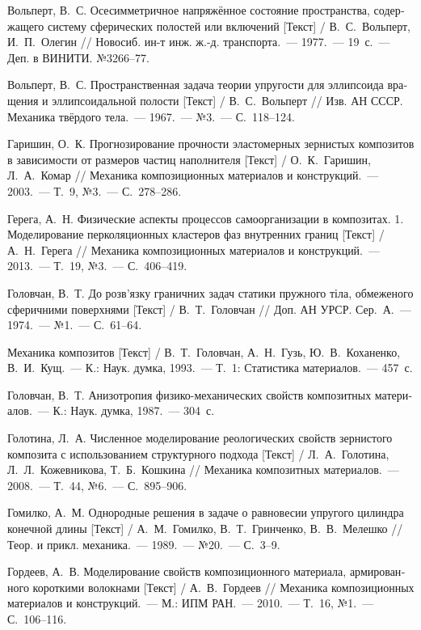 \begin{russian}
\begin{biblist}{99}
Вольперт, В.~С. Осесимметричное напряжённое состояние пространства, содержащего систему сферических полостей или включений [Текст] 
/ В.~С.~Вольперт, И.~П.~Олегин 
// Новосиб. ин-т инж. ж.-д. транспорта.~--- 1977.~--- 19~с.~--- Деп. в ВИНИТИ. №3266--77.

Вольперт, В.~С. 
Пространственная задача теории упругости для эллипсоида вращения и эллипсоидальной полости [Текст] 
/ В.~С.~Вольперт 
// Изв. АН СССР. Механика твёрдого тела.~--- 1967.~--- №3.~--- С.~118--124.

Гаришин, О.~К. 
Прогнозирование прочности эластомерных зернистых композитов в зависимости от размеров частиц наполнителя [Текст] 
/ О.~К.~Гаришин, Л.~А.~Комар 
// Механика композиционных материалов и конструкций.~--- 2003.~--- Т.~9, №3.~--- С.~278--286.

Герега, А.~Н. 
Физические аспекты процессов самоорганизации в композитах. 1. Моделирование перколяционных кластеров фаз внутренних границ [Текст] 
/ А.~Н.~Герега 
// Механика композиционных материалов и конструкций.~--- 2013.~--- Т.~19, №3.~--- С.~406--419.

Головчан, В.~Т. 
До розв’язку граничних задач статики пружного тіла, обмеженого сферичними поверхнями [Текст] 
/ В.~Т.~Головчан 
// Доп. АН УРСР. Сер.~А.~--- 1974.~--- №1.~--- С.~61--64.

Механика композитов [Текст] 
/ В.~Т.~Головчан, А.~Н.~Гузь, Ю.~В.~Коханенко, В.~И.~Кущ.~--- К.: Наук. думка, 1993.~--- Т.~1: Статистика материалов.~--- 457~с.

Головчан, В.~Т. 
Анизотропия физико-механических свойств композитных материалов.~--- К.: Наук. думка, 1987.~--- 304~с.

Голотина, Л.~А. 
Численное моделирование реологических свойств зернистого композита с использованием структурного подхода [Текст] 
/ Л.~А.~Голотина, Л.~Л.~Кожевникова, Т.~Б.~Кошкина 
// Механика композитных материалов.~--- 2008.~--- Т.~44, №6.~--- С.~895--906.

Гомилко, А.~М. 
Однородные решения в задаче о равновесии упругого цилиндра конечной длины [Текст] 
/ А.~М.~Гомилко, В.~Т.~Гринченко, В.~В.~Мелешко 
// Теор. и прикл. механика.~--- 1989.~--- №20.~--- С.~3--9.

Гордеев, А.~В. 
Моделирование свойств композиционного материала, армированного короткими волокнами [Текст] 
/ А.~В.~Гордеев 
// Механика композиционных материалов и конструкций.~--- М.: ИПМ РАН.~--- 2010.~--- Т.~16, №1.~--- С.~106--116.


\end{biblist}
\end{russian}
